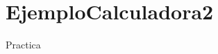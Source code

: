 \chapter{Ejemplo\+Calculadora2}
\hypertarget{md__r_e_a_d_m_e}{}\label{md__r_e_a_d_m_e}
\label{md__r_e_a_d_m_e_autotoc_md0}%
%
 Practica 